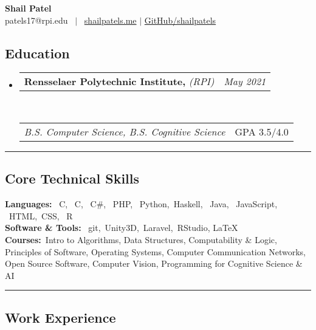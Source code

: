 \documentclass[10pt,letterpaper]{article}
\makeatletter
\newcommand{\headerrow}[2]
{\begin{tabular*}{\linewidth}{l@{\extracolsep{\fill}}r}
	#1 &
	#2 \\
\end{tabular*}}
\newcommand{\CPP}
{C\nolinebreak[4]\hspace{-.05em}\raisebox{.22ex}{\footnotesize\bf ++}}
\makeatother
\begin{document}
\begin{center}
	{\LARGE \textbf{Shail Patel}}
	\vspace{0.2em}\\
	patels17@rpi.edu
	 \ $\mid$ \ \href{http://shailpatels.me/}{shailpatels.me} 
	 $\mid$ \href{https://github.com/shailpatels}{GitHub/shailpatels}\\
\end{center}

\subsection*{Education}
\begin{itemize}
	\parskip=0.1em
	\item 
	\headerrow
		{\textbf{Rensselaer Polytechnic Institute,} \emph{(RPI)}}
		{\emph{May 2021}}
	\\
	\headerrow
		{\emph{B.S. Computer Science, B.S. Cognitive Science}}
		{GPA 3.5/4.0}
\end{itemize}
\hrule

\subsection*{Core Technical Skills}
\textbf{Languages:} \  C, \ \CPP, \ C\#, \ PHP, \ Python,\ Haskell, \ Java, \ JavaScript, \ HTML,\ CSS, \ R  \vspace{0.5em}\\
\textbf{Software \& Tools:} \ git,\ Unity3D,\ Laravel,\ RStudio, \LaTeX \vspace{0.1in}\\
\textbf{Courses:}\, Intro to Algorithms, Data Structures, Computability \& Logic, Principles of Software, Operating Systems, Computer Communication Networks, Open Source Software, Computer Vision, Programming for Cognitive Science \& AI\\
\hrule

\subsection*{Work Experience}
\end{document}
